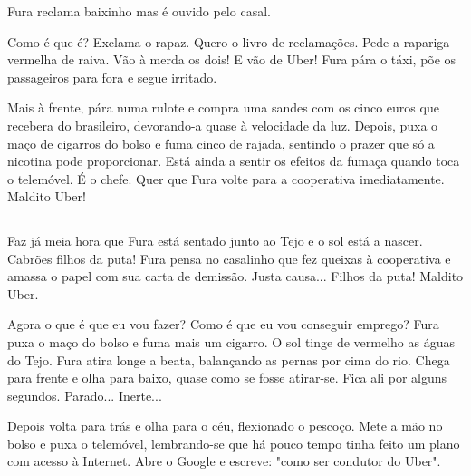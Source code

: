 \documentclass[12pt]{creativeWriting}
\begin{document}
 Fura reclama baixinho mas é ouvido pelo casal.

Como é que é? Exclama o rapaz. Quero o livro de reclamações. Pede a rapariga vermelha de raiva. Vão à merda os dois! E vão de Uber! Fura pára o táxi, põe os passageiros para fora e segue irritado.

Mais à frente, pára numa rulote e compra uma sandes com os cinco euros que recebera do brasileiro, devorando-a quase à velocidade da luz. Depois, puxa o maço de cigarros do bolso e fuma cinco de rajada, sentindo o prazer que só a nicotina pode proporcionar. Está ainda a sentir os efeitos da fumaça quando toca o telemóvel. É o chefe. Quer que Fura volte para a cooperativa imediatamente. Maldito Uber!

\rule[0.5ex]{\linewidth}{1pt}

Faz já meia hora que Fura está sentado junto ao Tejo e o sol está a nascer. Cabrões filhos da puta! Fura pensa no casalinho que fez queixas à cooperativa e amassa o papel com sua carta de demissão. Justa causa... Filhos da puta! Maldito Uber.

Agora o que é que eu vou fazer? Como é que eu vou conseguir emprego? Fura puxa o maço do bolso e fuma mais um cigarro. O sol tinge de vermelho as águas do Tejo. Fura atira longe a beata, balançando as pernas por cima do rio. Chega para frente e olha para baixo, quase como se fosse atirar-se. Fica ali por alguns segundos. Parado... Inerte...

Depois volta para trás e olha para o céu, flexionado o pescoço. Mete a mão no bolso e puxa o telemóvel, lembrando-se que há pouco tempo tinha feito um plano com acesso à Internet. Abre o Google e escreve: "como ser condutor do Uber".
\end{document}
